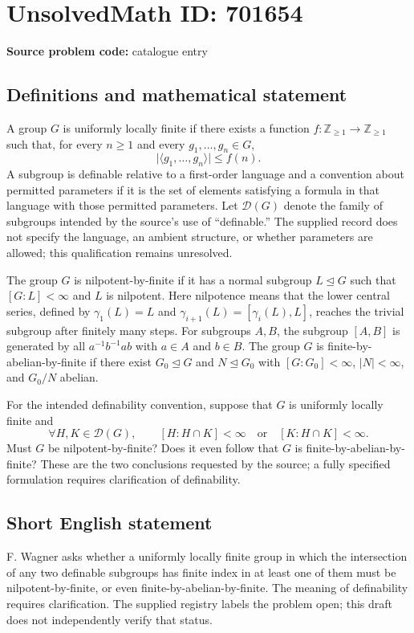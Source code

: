 \documentclass[11pt]{article}
\newcommand{\Z}{\mathbb{Z}}
\begin{document}
\section*{UnsolvedMath ID: 701654}
\textbf{Source problem code:} catalogue entry
\subsection{Definitions and mathematical statement}
A group \(G\) is uniformly locally finite if there exists a function \(f\colon \Z_{\geq 1}\to\Z_{\geq 1}\) such that, for every \(n\geq 1\) and every \(g_1,\ldots,g_n\in G\),
\[
\bigl|\langle g_1,\ldots,g_n\rangle\bigr|\leq f(n).
\]
A subgroup is definable relative to a first-order language and a convention about permitted parameters if it is the set of elements satisfying a formula in that language with those permitted parameters. Let \(\mathcal D(G)\) denote the family of subgroups intended by the source's use of ``definable.'' The supplied record does not specify the language, an ambient structure, or whether parameters are allowed; this qualification remains unresolved.

The group \(G\) is nilpotent-by-finite if it has a normal subgroup \(L\trianglelefteq G\) such that \([G:L]<\infty\) and \(L\) is nilpotent. Here nilpotence means that the lower central series, defined by \(\gamma_1(L)=L\) and \(\gamma_{i+1}(L)=[\gamma_i(L),L]\), reaches the trivial subgroup after finitely many steps. For subgroups \(A,B\), the subgroup \([A,B]\) is generated by all \(a^{-1}b^{-1}ab\) with \(a\in A\) and \(b\in B\). The group \(G\) is finite-by-abelian-by-finite if there exist \(G_0\trianglelefteq G\) and \(N\trianglelefteq G_0\) with \([G:G_0]<\infty\), \(|N|<\infty\), and \(G_0/N\) abelian.

For the intended definability convention, suppose that \(G\) is uniformly locally finite and
\[
\forall H,K\in\mathcal D(G),\qquad
[H:H\cap K]<\infty\quad\text{or}\quad[K:H\cap K]<\infty.
\]
Must \(G\) be nilpotent-by-finite? Does it even follow that \(G\) is finite-by-abelian-by-finite? These are the two conclusions requested by the source; a fully specified formulation requires clarification of definability.
\subsection{Short English statement}
F. Wagner asks whether a uniformly locally finite group in which the intersection of any two definable subgroups has finite index in at least one of them must be nilpotent-by-finite, or even finite-by-abelian-by-finite. The meaning of definability requires clarification. The supplied registry labels the problem open; this draft does not independently verify that status.
\end{document}
